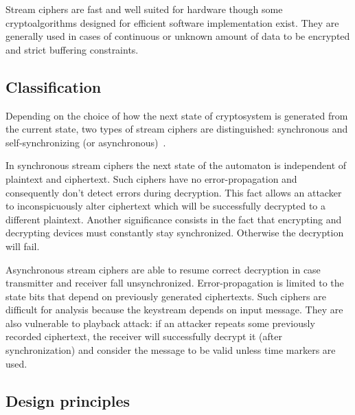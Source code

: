 Stream ciphers are fast and well suited for hardware though some
cryptoalgorithms designed for efficient software implementation exist. They are
generally used in cases of continuous or unknown amount of data to be encrypted
and strict buffering constraints.

\subsection{Classification}
\label{sec:stream_ciphers_classification}

Depending on the choice of how the next state of cryptosystem is generated from
the current state, two types of stream ciphers are distinguished: synchronous
and self-synchronizing (or asynchronous)~\cite{menezes:applied_cryptography}.

In synchronous stream ciphers the next state of the automaton is independent of
plaintext and ciphertext. Such ciphers have no error-propagation and
consequently don't detect errors during decryption. This fact allows an attacker
to inconspicuously alter ciphertext which will be successfully decrypted to a
different plaintext. Another significance consists in the fact that encrypting 
and decrypting devices must constantly stay synchronized. Otherwise the
decryption will fail.

Asynchronous stream ciphers are able to resume correct decryption in case
transmitter and receiver fall unsynchronized. Error-propagation is limited to
the state bits that depend on previously generated ciphertexts. Such ciphers are
difficult for analysis because the keystream depends on input message. They
are also vulnerable to playback attack: if an attacker repeats some previously
recorded ciphertext, the receiver will successfully decrypt it (after
synchronization) and consider the message to be valid unless time markers are
used.

\subsection{Design principles}

